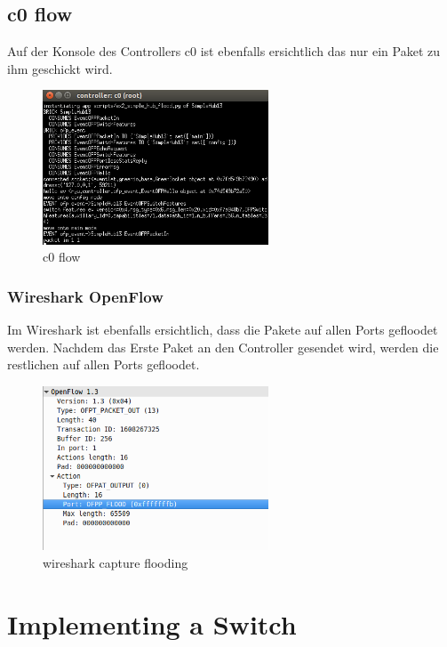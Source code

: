 \documentclass[a4,12pt]{scrartcl}
\begin{document}
\subsection{c0 flow}
Auf der Konsole des Controllers c0 ist ebenfalls ersichtlich das nur ein Paket zu ihm geschickt wird. 
\begin{figure} [H]
	\begin{center}
	\includegraphics[width=0.60\textwidth]{./pictures/c0_ex2.png}
	\caption{c0 flow}
	\label{x}
	\end{center}
\end{figure} 

\subsubsection{Wireshark OpenFlow}
Im Wireshark ist ebenfalls ersichtlich, dass die Pakete auf allen Ports gefloodet werden. 
Nachdem das Erste Paket an den Controller gesendet wird, werden die restlichen auf allen Ports gefloodet. 
\begin{figure} [H]
	\begin{center}
	\includegraphics[width=0.60\textwidth]{./pictures/wireshark-flood.png}
	\caption{wireshark capture flooding}
	\label{x}
	\end{center}
\end{figure} 
\newpage

\section{Implementing a Switch}
\end{document}
